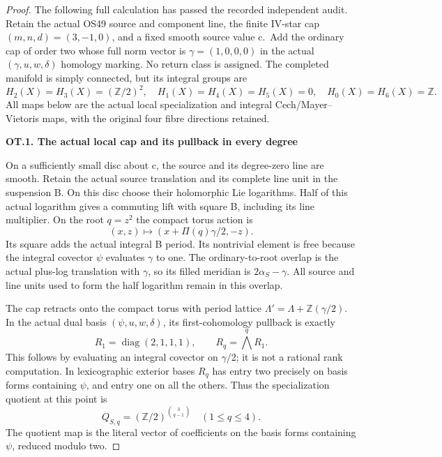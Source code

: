 \begin{proof}
The following full calculation has passed the recorded independent audit. Retain the actual OS49 source and
component line, the finite IV-star cap \((m,n,d)=(3,-1,0)\), and a fixed smooth
source value c.~Add the ordinary cap of order two whose full norm vector
is \(\gamma=(1,0,0,0)\) in the actual \((\gamma,u,w,\delta)\) homology marking. No
return class is assigned. The completed manifold is simply connected,
but its integral groups are
\[
 H_2(X)=H_3(X)=(\mathbb Z/2)^2,
 \quad H_1(X)=H_4(X)=H_5(X)=0,
 \quad H_0(X)=H_6(X)=\mathbb Z.                     \tag{OT.1}
\]
All maps below are the actual local specialization and integral
Cech/Mayer--Vietoris maps, with the original four fibre directions retained.

\par

\medskip\noindent\textbf{OT.1. The actual local cap and its pullback in every degree}

\par\nobreak

On a sufficiently small disc about c, the source and its degree-zero line
are smooth. Retain the actual source translation and its complete line
unit in the suspension B. On this disc choose their holomorphic Lie
logarithms. Half of this actual logarithm gives a commuting lift with
square B, including its line multiplier. On the root \(q=z^2\) the compact
torus action is
\[
                  (x,z)\longmapsto
                 (x+\Pi(q)\gamma/2,-z).                 \tag{OT.2}
\]
Its square adds the actual integral B period. Its nontrivial element is
free because the integral covector \(\psi\) evaluates \(\gamma\) to one. The
ordinary-to-root overlap is the actual plus-log translation with \(\gamma\),
so its filled meridian is \(2\alpha_S-\gamma\). All source and line units used
to form the half logarithm remain in this overlap.

The cap retracts onto the compact torus with period lattice
\(\Lambda'=\Lambda+\mathbb Z(\gamma/2)\). In the actual dual basis \((\psi,u,w,\delta)\), its
first-cohomology pullback is exactly
\[
                R_1=\operatorname{diag}(2,1,1,1),
                 \qquad R_q=\bigwedge^q R_1.              \tag{OT.3}
\]
This follows by evaluating an integral covector on \(\gamma\)/2; it is not a
rational rank computation. In lexicographic exterior bases \(R_q\) has
entry two precisely on basis forms containing \(\psi\), and entry one on
all the others. Thus the specialization quotient at this point is
\[
           Q_{S,q}=(\mathbb Z/2)^{\binom3{q-1}}
                 \quad(1\le q\le4).                    \tag{OT.4}
\]
The quotient map is the literal vector of coefficients on the basis
forms containing \(\psi\), reduced modulo two.


\end{proof}
